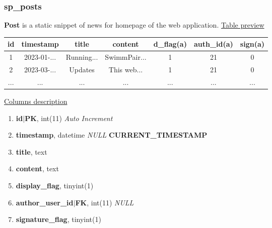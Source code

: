 \subsubsection*{sp\_posts}
\textbf{Post} is a static snippet of news for homepage of the web application.
\newline
\underline{Table preview}
\begin{center}
  \begin{tabular}{||c c c c c c c||} 
  \hline
  id & timestamp & title & content & d\_flag(a) & auth\_id(a) & sign(a)  \\ [0.5ex] 
  \hline\hline
  1 & 2023-01-... & Running... & SwimmPair... & 1 & 21 & 0 \\ 
  \hline
  2 & 2023-03-...  & Updates & This web... & 1 & 21 & 0 \\ 
 \hline
  ... & ... & ... & ... & ... & ...  & ... \\ [0.5ex] 
  \hline
  \end{tabular}
\end{center}
\underline{Columns description}
\begin{enumerate}
  \setlength\itemsep{0em}
  \item \textbf{id$|$PK}, int(11) \textit{Auto Increment}
  \item \textbf{timestamp}, datetime \textit{NULL} \lbrack \textbf{CURRENT\_TIMESTAMP}\rbrack 
  \item \textbf{title}, text
  \item \textbf{content}, text
  \item \textbf{display\_flag}, tinyint(1)
  \item \textbf{author\_user\_id$|$FK}, int(11) \textit{NULL}
  \item \textbf{signature\_flag}, tinyint(1)
\end{enumerate}

